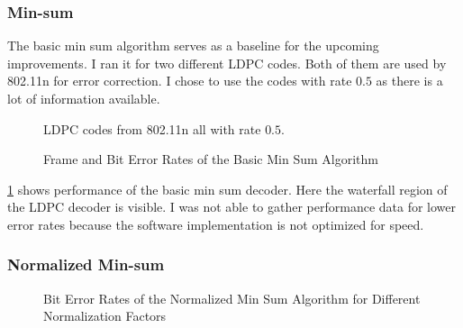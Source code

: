 \subsubsection{Min-sum}
The basic min sum algorithm serves as a baseline for the upcoming improvements. I ran it for two different LDPC codes. Both of them are used by 802.11n for error correction. I chose to use the codes with rate $0.5$ as there is a lot of information available.
\begin{figure}
    \centering

    LDPC codes from 802.11n all with rate $0.5$.
    \caption{Frame and Bit Error Rates of the Basic Min Sum Algorithm}
    \label{min_sum_base}
\end{figure}

\cref{min_sum_base} shows performance of the basic min sum decoder. Here the waterfall region of the LDPC decoder is visible. I was not able to gather performance data for lower error rates because the software implementation is not optimized for speed.

\subsubsection{Normalized Min-sum}

\begin{figure}
    \centering
    \label{min_sum_norm_opt}
    \caption{Bit Error Rates of the Normalized Min Sum Algorithm for Different Normalization Factors}
\end{figure}


